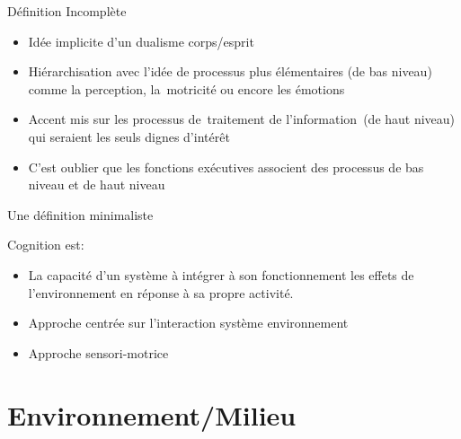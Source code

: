 \documentclass{beamer}
\begin{document}
\begin{frame}{Définition Incomplète}
\begin{itemize}
    \item Idée implicite d’un dualisme corps/esprit
    \item Hiérarchisation avec l’idée de processus plus élémentaires (de bas niveau) comme la perception, la motricité ou encore les émotions
    \item Accent mis sur  les processus de traitement de l'information (de haut niveau) qui seraient les seuls dignes d’intérêt
    \item C’est oublier que les fonctions exécutives associent des processus de bas niveau et de haut niveau
\end{itemize}
\end{frame}

\begin{frame}{Une définition minimaliste}

Cognition est:
\begin{itemize}
    \item La capacité d’un système à intégrer à son fonctionnement les effets de l’environnement en réponse à sa propre activité.
    \item Approche centrée sur l’interaction système environnement
    \item Approche sensori-motrice
\end{itemize}
    
\end{frame}

\section{Environnement/Milieu}
\end{document}
